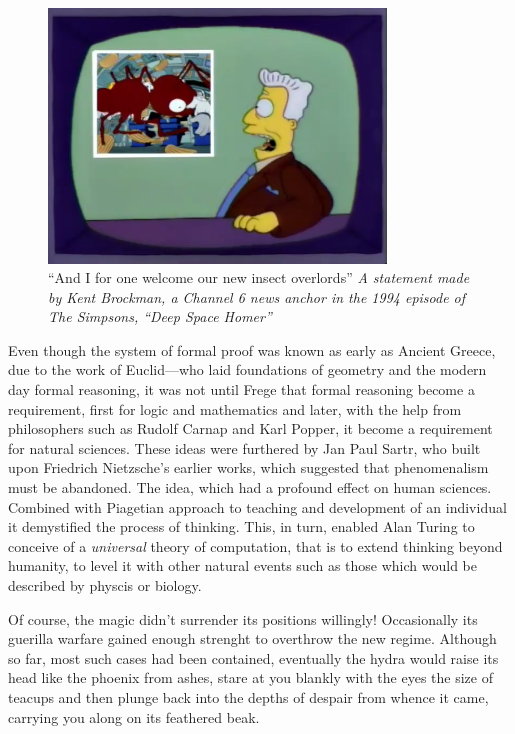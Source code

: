 \documentclass[11pt]{article}
\begin{document}
\begin{figure}[h!]
  \centering
  \includegraphics[width=0.8\textwidth]{./insect-overlords.png}
  \caption[Welcome insect overlords]{
    \ssmall ``And I for one welcome our new insect overlords''
    \textit{A statement made by Kent Brockman, a Channel 6 news anchor in
      the 1994 episode of The Simpsons, ``Deep Space Homer''}}
\end{figure}

Even though the system of formal proof was known as early as Ancient Greece,
due to the work of Euclid---who laid foundations of geometry and the modern
day formal reasoning, it was not until Frege that formal reasoning become a
requirement, first for logic and mathematics and later, with the help from
philosophers such as Rudolf Carnap and Karl Popper, it become a requirement
for natural sciences.  These ideas were furthered by Jan Paul Sartr, who
built upon Friedrich Nietzsche's earlier works, which suggested that
phenomenalism must be abandoned.  The idea, which had a profound effect on
human sciences.  Combined with Piagetian approach to teaching and development
of an individual it demystified the process of thinking.  This, in turn,
enabled Alan Turing to conceive of a \emph{universal} theory of computation, that
is to extend thinking beyond humanity, to level it with other natural events
such as those which would be described by physcis or biology.

Of course, the magic didn't surrender its positions willingly! Occasionally
its guerilla warfare gained enough strenght to overthrow the new regime.
Although so far, most such cases had been contained, eventually the hydra
would raise its head like the phoenix from ashes, stare at you blankly with
the eyes the size of teacups and then plunge back into the depths of despair
from whence it came, carrying you along on its feathered beak.
\end{document}
